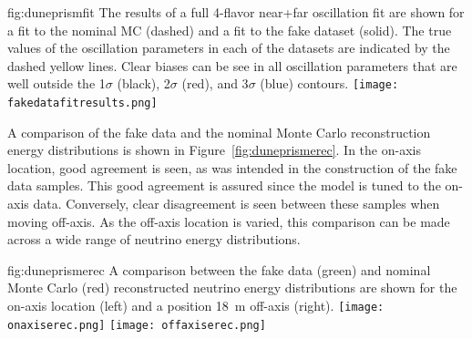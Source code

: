 \begin{dunefigure}{fig:duneprismfit}
{The results of a full 4-flavor near+far oscillation fit are shown for a fit to the nominal MC (dashed) and a fit to the fake dataset (solid). The true values of the oscillation parameters in each of the datasets are indicated by the dashed yellow lines. Clear biases can be see in all oscillation parameters that are well outside the 1$\sigma$ (black), 2$\sigma$ (red), and 3$\sigma$ (blue) contours.}
      \texttt{[image: fakedatafitresults.png]}
\end{dunefigure}

A comparison of the fake data and the nominal Monte Carlo reconstruction energy distributions is shown in Figure~\ref{fig:duneprismerec}. In the on-axis location, good agreement is seen, as was intended in the construction of the fake data samples. This good agreement is assured since the model is tuned to the on-axis data.  Conversely, clear disagreement is seen between these samples when moving off-axis. As the off-axis location is varied, this comparison can be made across a wide range of neutrino energy distributions.

\begin{dunefigure}{fig:duneprismerec}
{A comparison between the fake data (green) and nominal Monte Carlo (red) reconstructed neutrino energy distributions are shown for the on-axis   location (left) and a position 18~m off-axis (right).}
      \texttt{[image: onaxiserec.png]}
      \texttt{[image: offaxiserec.png]}
\end{dunefigure}

